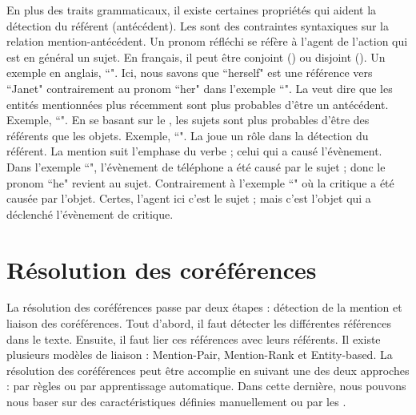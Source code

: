 \documentclass{KodeBook}
\begin{document}
En plus des traits grammaticaux, il existe certaines propriétés qui aident la détection du référent (antécédent).
Les   sont des contraintes syntaxiques sur la relation mention-antécédent.
Un pronom réfléchi se réfère à l'agent de l'action qui est en général un sujet. 
En français, il peut être conjoint () ou disjoint ().
Un exemple en anglais, ``". 
Ici, nous savons que ``herself" est une référence vers ``Janet" contrairement au pronom ``her" dans l'exemple ``".
La  veut dire que les entités mentionnées plus récemment sont plus probables d'être un antécédent.
Exemple, ``".
En se basant sur le , les sujets sont plus probables d'être des référents que les objets. 
Exemple, ``".
La  joue un rôle dans la détection du référent. 
La mention suit l'emphase du verbe ; celui qui a causé l'évènement.
Dans l'exemple ``", l'évènement de téléphone a été causé par le sujet ; donc le pronom ``he" revient au sujet. 
Contrairement à l'exemple ``" où la critique a été causée par l'objet. 
Certes, l'agent ici c'est le sujet ; mais c'est l'objet qui a déclenché l'évènement de critique.

\section{Résolution des coréférences}

La résolution des coréférences passe par deux étapes : détection de la mention et liaison des coréférences. 
Tout d'abord, il faut détecter les différentes références dans le texte. 
Ensuite, il faut lier ces références avec leurs référents.
Il existe plusieurs modèles de liaison : Mention-Pair, Mention-Rank et Entity-based.
La résolution des coréférences peut être accomplie en suivant une des deux approches : par règles ou par apprentissage automatique. 
Dans cette dernière, nous pouvons nous baser sur des caractéristiques définies manuellement ou par les .
\end{document}
